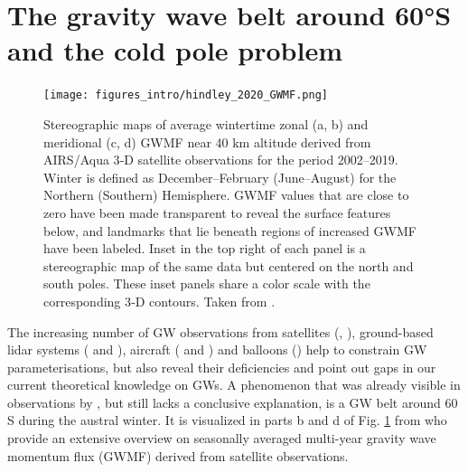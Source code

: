 \section{The gravity wave belt around 60°S and the cold pole problem}
\label{sec:waveBelt} %
%
\begin{figure}[ht]
    \centering
    \texttt{[image: figures\_intro/hindley\_2020\_GWMF.png]}
    \caption{Stereographic maps of average wintertime zonal (a, b) and meridional (c, d) GWMF near 40 km altitude derived from AIRS/Aqua 3‐D satellite observations for the period 2002–2019. Winter is defined as December–February (June–August) for the Northern (Southern) Hemisphere. GWMF values that are close to zero have been made transparent to reveal the surface features below, and landmarks that lie beneath regions of increased GWMF have been labeled. Inset in the top right of each panel is a stereographic map of the same data but centered on the north and south poles. These inset panels share a color scale with the corresponding 3‐D contours. Taken from \cite{hindley_18year_2020}.}
    \label{fig:hindley_2020_GWMF}
\end{figure}
%
The increasing number of GW observations from satellites (\cite{hindley_gravity_2019}, \citeyear{hindley_18year_2020}), ground-based lidar systems (\cite{kaifler_lidar_2020} and  \cite{kaifler_compact_2021}), aircraft (\cite{rapp_southtrac-gw_2021} and \cite{fritts_deep_2016}) and  balloons (\cite{plougonven_gravity_2013}) help to constrain GW parameterisations, but also reveal their deficiencies and point out gaps in our current theoretical knowledge on GWs. A phenomenon that was already visible in observations by \textcite{wu_satellite_1996}, but still lacks a conclusive explanation, is a GW belt around 60 \degree S during the austral winter. It is visualized in parts b and d of Fig. \ref{fig:hindley_2020_GWMF} from \textcite{hindley_18year_2020} who provide an extensive overview on seasonally averaged multi-year gravity wave momentum flux (GWMF) derived from satellite observations.


